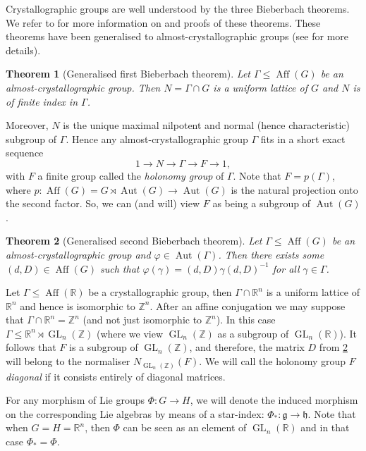 \documentclass[a4paper]{article}
\theoremstyle{plain}
\newtheorem{theorem}{Theorem}[section]
\theoremstyle{definition}
\theoremstyle{remark}
\DeclareMathOperator{\Aut}{Aut}
\DeclareMathOperator{\GL}{GL}
\DeclareMathOperator{\Aff}{Aff}
\newcommand{\ZZ}{{\mathbb{Z}}}
\newcommand{\RR}{{\mathbb{R}}}
\newcommand{\lie}[1]{{\mathfrak {#1}}}
\begin{document}
Crystallographic groups are well understood by the three Bieberbach theorems. We refer to  \cite{wolf77-1,char86-1,szcz12-1} for more information on and proofs of these theorems.  These theorems have been generalised to almost-crystallographic groups (see \cite{deki96-1} for more details).

\begin{theorem}[Generalised first Bieberbach theorem]
	Let \(\Gamma \leq \Aff(G)\) be an almost-crystallographic group. Then \(N = \Gamma \cap G\) is a uniform lattice of \(G\) and \(N\) is of finite index in \(\Gamma\). 
\end{theorem}

Moreover, \(N\) is the unique maximal nilpotent  and normal (hence characteristic) subgroup of \(\Gamma\). Hence
any almost-crystallographic group \(\Gamma\) fits in a short exact sequence
\begin{equation*}
1 \to N \to \Gamma \to F \to 1,
\end{equation*}
with \(F\) a finite group called the \emph{holonomy group} of \(\Gamma\).  Note that \(F=p(\Gamma)\), where \(p:\Aff(G)=G\rtimes \Aut(G)\to \Aut(G)\) is the natural projection onto the second factor. So, we can (and will) view \(F\) as being a subgroup of \(\Aut(G)\).
\begin{theorem}[Generalised second Bieberbach theorem]
	\label{thm:gensecbieb}
	Let \(\Gamma \leq \Aff(G)\) be an almost-crystallographic group and \(\varphi \in \Aut(\Gamma)\). Then there exists some \((d,D) \in \Aff(G)\) such that \(\varphi(\gamma) = (d,D)\gamma(d,D)^{-1}\) for all \(\gamma \in \Gamma\).
\end{theorem}

Let \(\Gamma\leq \Aff(\RR)\) be a crystallographic group, then \(\Gamma\cap \RR^n\) is a uniform lattice of \(\RR^n\) and hence is isomorphic to \(\ZZ^n\). After an affine conjugation we may suppose that \(\Gamma\cap \RR^n=\ZZ^n\) (and not just isomorphic to \(\ZZ^n\)). In this case \(\Gamma \leq \RR^n \rtimes \GL_n(\ZZ)\) (where we view $\GL_n(\ZZ)$ as a subgroup of \(\GL_n(\RR)\)). It follows that \(F\) is a subgroup of \(\GL_n(\ZZ)\), and therefore, the matrix \(D\) from \cref{thm:gensecbieb} will belong to the normaliser \(N_{\GL_n(\ZZ)}(F)\). We will call the holonomy group \(F\) \emph{diagonal} if it consists entirely of diagonal matrices.

\medskip


For any morphism of Lie groups \(\Phi: G \to H\), we will denote the induced morphism on the corresponding Lie algebras by means of a star-index: \(\Phi_*: \lie{g} \to \lie{h}\). Note that when \(G=H=\RR^n\), then \(\Phi\) can be seen as an element of \(\GL_n(\RR)\) and in that case \(\Phi_\ast=\Phi\). 
\end{document}
